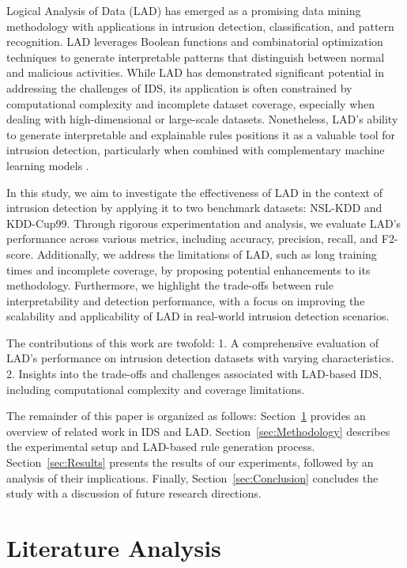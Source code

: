 \documentclass[pdflatex,sn-mathphys-num]{sn-jnl}%
\theoremstyle{thmstyleone}%
\theoremstyle{thmstyletwo}%
\theoremstyle{thmstylethree}%
\begin{document}
Logical Analysis of Data (LAD) has emerged as a promising data mining methodology with applications in intrusion detection, classification, and pattern recognition. LAD leverages Boolean functions and combinatorial optimization techniques to generate interpretable patterns that distinguish between normal and malicious activities. While LAD has demonstrated significant potential in addressing the challenges of IDS, its application is often constrained by computational complexity and incomplete dataset coverage, especially when dealing with high-dimensional or large-scale datasets. Nonetheless, LAD's ability to generate interpretable and explainable rules positions it as a valuable tool for intrusion detection, particularly when combined with complementary machine learning models \cite{LAD1, LAD2}.

In this study, we aim to investigate the effectiveness of LAD in the context of intrusion detection by applying it to two benchmark datasets: NSL-KDD and KDD-Cup99. Through rigorous experimentation and analysis, we evaluate LAD's performance across various metrics, including accuracy, precision, recall, and F2-score. Additionally, we address the limitations of LAD, such as long training times and incomplete coverage, by proposing potential enhancements to its methodology. Furthermore, we highlight the trade-offs between rule interpretability and detection performance, with a focus on improving the scalability and applicability of LAD in real-world intrusion detection scenarios.

The contributions of this work are twofold:
1. A comprehensive evaluation of LAD's performance on intrusion detection datasets with varying characteristics.
2. Insights into the trade-offs and challenges associated with LAD-based IDS, including computational complexity and coverage limitations.

The remainder of this paper is organized as follows: Section~\ref{sec:Review} provides an overview of related work in IDS and LAD. Section~\ref{sec:Methodology} describes the experimental setup and LAD-based rule generation process. Section~\ref{sec:Results} presents the results of our experiments, followed by an analysis of their implications. Finally, Section~\ref{sec:Conclusion} concludes the study with a discussion of future research directions.

\section{Literature Analysis} \label{sec:Review}
\end{document}
